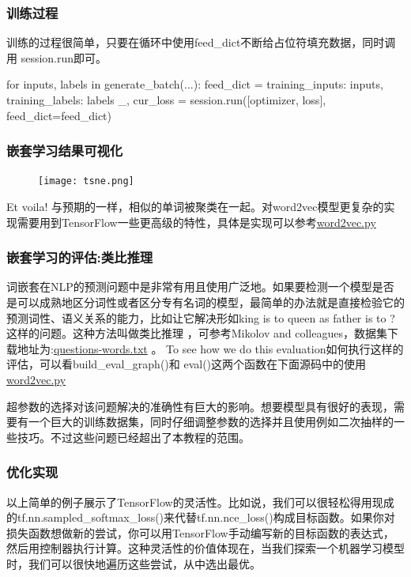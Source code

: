 \subsubsection{训练过程}
训练的过程很简单，只要在循环中使用feed\_dict不断给占位符填充数据，同时调用 session.run即可。
\begin{python}
for inputs, labels in generate_batch(...):
  feed_dict = {training_inputs: inputs, training_labels: labels}
  _, cur_loss = session.run([optimizer, loss], feed_dict=feed_dict)
\end{python}
\subsubsection{嵌套学习结果可视化}
\begin{center}
\begin{figure}[H]
\texttt{[image: tsne.png]}
\end{figure}
\end{center}
Et voila! 与预期的一样，相似的单词被聚类在一起。对word2vec模型更复杂的实现需要用到TensorFlow一些更高级的特性，具体是实现可以参考\href{https://github.com/bleedingfight/models/tree/master/tutorials/embedding}{word2vec.py}\subsubsection{嵌套学习的评估:类比推理}
词嵌套在NLP的预测问题中是非常有用且使用广泛地。如果要检测一个模型是否是可以成熟地区分词性或者区分专有名词的模型，最简单的办法就是直接检验它的预测词性、语义关系的能力，比如让它解决形如king is to queen as father is to ?这样的问题。这种方法叫做类比推理 ，可参考Mikolov and colleagues，数据集下载地址为:\href{https://word2vec.googlecode.com/svn/trunk/questions-words.txt}{questions-words.txt} 。
To see how we do this evaluation如何执行这样的评估，可以看build\_eval\_graph()和 eval()这两个函数在下面源码中的使用 \href{https://github.com/bleedingfight/models/tree/master/tutorials/embedding}{word2vec.py}

超参数的选择对该问题解决的准确性有巨大的影响。想要模型具有很好的表现，需要有一个巨大的训练数据集，同时仔细调整参数的选择并且使用例如二次抽样的一些技巧。不过这些问题已经超出了本教程的范围。
\subsubsection{优化实现}
以上简单的例子展示了TensorFlow的灵活性。比如说，我们可以很轻松得用现成的tf.nn.sampled\_softmax\_loss()来代替tf.nn.nce\_loss()构成目标函数。如果你对损失函数想做新的尝试，你可以用TensorFlow手动编写新的目标函数的表达式，然后用控制器执行计算。这种灵活性的价值体现在，当我们探索一个机器学习模型时，我们可以很快地遍历这些尝试，从中选出最优。

